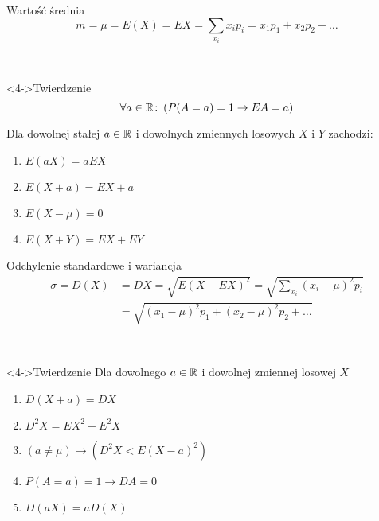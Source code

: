 \documentclass{mp}
\subtitle{Momenty zmiennych losowych}
\begin{document}
\frame{\titlepage}

\begin{frame}{Wartość średnia}
\[ m=\mu=E(X)=EX=\sum_{x_i} x_ip_i=x_1p_1+x_2p_2+\ldots \]
{
	\begin{center}
	     \\
	\only<3->{\dice{1} \dice{2} \dice{3} \dice{6} \dice{6} \dice{6}}
	\end{center}
}
\begin{block}<4->{Twierdzenie}
{
	\[\forall a\in\mathbb{R}\colon \left( P(A=a)=1 \to EA=a \right) \]
}
{
Dla dowolnej stałej $a\in\mathbb{R}$ i dowolnych zmiennych losowych $X$ i $Y$ zachodzi:
\begin{enumerate}
\item<5-> $E(aX)=aEX$
\item<6-> $E(X+a)=EX+a$
\item<7-> $E(X-\mu)=0$
\item<8-> $E(X+Y)=EX+EY$ %
\end{enumerate}
}
\end{block}
\end{frame}
\begin{frame}{Odchylenie standardowe i wariancja}
\begin{align*}
 \sigma=D(X)&=DX=\sqrt{E(X-EX)^2} =\sqrt{\sum_{x_i}(x_i-\mu)^2p_i} \\ & =
 \sqrt{(x_1-\mu)^2p_1+(x_2-\mu)^2p_2+\ldots}
\end{align*}
{
	\begin{center}
	     \\
	\only<3->{\dice{1} \dice{2} \dice{3} \dice{6} \dice{6} \dice{6}}
	\end{center}
}
\begin{block}<4->{Twierdzenie}
	Dla dowolnego $a\in\mathbb{R}$ i dowolnej zmiennej losowej $X$
\begin{enumerate}
\item<4-> $D(X+a)=DX $
\item<5-> $D^2X=EX^2-E^2X$
\item<6-> $(a\neq \mu)\to (D^2X<E(X-a)^2) $
\item<7-> $P(A=a)=1 \to DA=0 $
\item<8-> $D(aX)=aD(X) $
\end{enumerate}
\end{block}
\end{frame}
\end{document}
